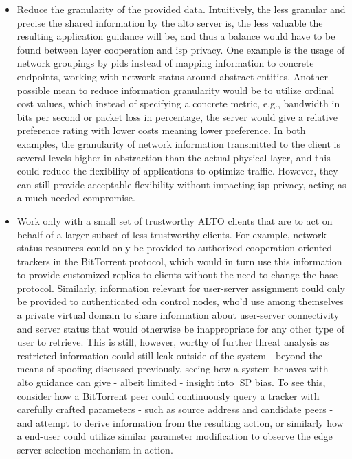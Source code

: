 \begin{itemize}
    \item Reduce the granularity of the provided data.
        Intuitively, the less granular and precise the shared information by the \gls{alto} server is, the less valuable the resulting application guidance will be, and thus a balance would have to be found between layer cooperation and \gls{isp} privacy.
        One example is the usage of network groupings by \glspl{pid} instead of mapping information to concrete endpoints, working with network status around abstract entities.
        Another possible mean to reduce information granularity would be to utilize ordinal cost values, which instead of specifying a concrete metric, e.g., bandwidth in bits per second or packet loss in percentage, the server would give a relative preference rating with lower costs meaning lower preference.
        In both examples, the granularity of network information transmitted to the client is several levels higher in abstraction than the actual physical layer, and this could reduce the flexibility of applications to optimize traffic.
        However, they can still provide acceptable flexibility without impacting \gls{isp} privacy, acting as a much needed compromise.

    \item Work only with a small set of trustworthy \gls{ALTO} clients that are to act on behalf of a larger subset of less trustworthy clients.
        For example, network status resources could only be provided to authorized cooperation-oriented trackers in the BitTorrent protocol, which would in turn use this information to provide customized replies to clients without the need to change the base protocol.
        Similarly, information relevant for user-server assignment could only be provided to authenticated \gls{cdn} control nodes, who'd use among themselves a private virtual domain to share information about user-server connectivity and server status that would otherwise be inappropriate for any other type of user to retrieve.
        This is still, however, worthy of further threat analysis as restricted information could still leak outside of the system - beyond the means of spoofing discussed previously, seeing how a system behaves with \gls{alto} guidance can give - albeit limited - insight into SP bias.
        To see this, consider how a BitTorrent peer could continuously query a tracker with carefully crafted parameters - such as source address and candidate peers - and attempt to derive information from the resulting action, or similarly how a end-user could utilize similar parameter modification to observe the edge server selection mechanism in action.


\end{itemize}
